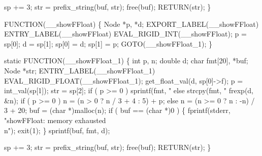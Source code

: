     sp += 3;
    str = prefix_string(buf, str);
    free(buf);
    RETURN(str);
\}

FUNCTION(__showFFloat)
\{
    Node *p, *d;
    EXPORT_LABEL(__showFFloat)
 ENTRY_LABEL(__showFFloat)
    EVAL_RIGID_INT(__showFFloat);
    p     = sp[0];
    d     = sp[1];
    sp[0] = d;
    sp[1] = p;
    GOTO(__showFFloat_1);
\}

static
FUNCTION(__showFFloat_1)
\{
    int    p, n;
    double d;
    char   fmt[20], *buf;
    Node   *str;
 ENTRY_LABEL(__showFFloat_1)
    EVAL_RIGID_FLOAT(__showFFloat_1);
    get_float_val(d, sp[0]->f);
    p   = int_val(sp[1]);
    str = sp[2];
    if ( p >= 0 )
        sprintf(fmt, "%
    else
        strcpy(fmt, "%
    frexp(d, &n);
    if ( p >= 0 )
        n = (n > 0 ? n / 3 + 4 : 5) + p;
    else
        n = (n >= 0 ? n : -n) / 3 + 20;
    buf = (char *)malloc(n);
    if ( buf == (char *)0 )
    \{
        fprintf(stderr, "showFFloat: memory exhausted\\n");
        exit(1);
    \}
    sprintf(buf, fmt, d);

    sp += 3;
    str = prefix_string(buf, str);
    free(buf);
    RETURN(str);
\}
\nwendcode{}

%

